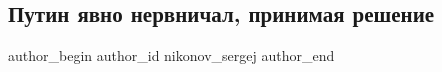  
 
 
 
 
 
\subsection{Путин явно нервничал, принимая решение}
\label{sec:21_02_2022.fb.nikonov_sergej.1.putin_reshenie}
 
\ifcmt
 author_begin
   author_id nikonov_sergej
 author_end
\fi

